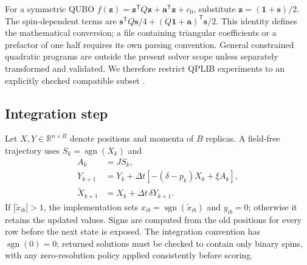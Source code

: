 \documentclass[11pt,a4paper]{article}
\begin{document}
For a symmetric QUBO $f(\boldsymbol{z})=\boldsymbol{z}^{\mathsf T}Q\boldsymbol{z}+\boldsymbol{a}^{\mathsf T}\boldsymbol{z}+c_0$, substitute $\boldsymbol{z}=(\boldsymbol{1}+\boldsymbol{s})/2$. The spin-dependent terms are $\boldsymbol{s}^{\mathsf T}Q\boldsymbol{s}/4+(Q\boldsymbol{1}+\boldsymbol{a})^{\mathsf T}\boldsymbol{s}/2$. This identity defines the mathematical conversion; a file containing triangular coefficients or a prefactor of one half requires its own parsing convention. General constrained quadratic programs are outside the present solver scope unless separately transformed and validated. We therefore restrict QPLIB experiments to an explicitly checked compatible subset \cite{qplib}.

\subsection{Integration step}\label{sec:step}
Let $X,Y\in\mathbb R^{n\times B}$ denote positions and momenta of $B$ replicas. A field-free trajectory uses $S_k=\operatorname{sgn}(X_k)$ and
\begin{align}
 A_k &= J S_k,\label{eq:coupling}\\
 Y_{k+1} &=Y_k+\Delta t[-(\delta-p_k)X_k+\xi A_k],\\
 \widetilde X_{k+1}&=X_k+\Delta t\,\delta Y_{k+1}.\label{eq:update}
\end{align}
If $|\widetilde x_{ib}|>1$, the implementation sets $x_{ib}=\operatorname{sgn}(\widetilde x_{ib})$ and $y_{ib}=0$; otherwise it retains the updated values. Signs are computed from the old positions for every row before the next state is exposed. The integration convention has $\operatorname{sgn}(0)=0$; returned solutions must be checked to contain only binary spins, with any zero-resolution policy applied consistently before scoring.
\end{document}
